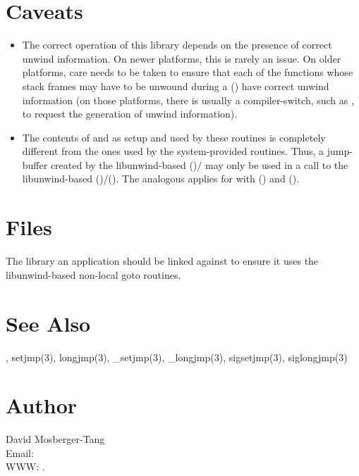 \documentclass{article}
\begin{document}
\section{Caveats}

\begin{itemize}
\item The correct operation of this library depends on the presence of
  correct unwind information.  On newer platforms, this is rarely an
  issue.  On older platforms, care needs to be taken to
  ensure that each of the functions whose stack frames may have to be
  unwound during a () have correct unwind information
  (on those platforms, there is usually a compiler-switch, such as
  , to request the generation of unwind
  information).
\item The contents of  and  as setup
  and used by these routines is completely different from the ones
  used by the system-provided routines.  Thus, a jump-buffer created
  by the libunwind-based ()/ may only be
  used in a call to the libunwind-based
  ()/().  The analogous applies for
   with () and ().
\end{itemize}

\section{Files}

\begin{Description}
\item[\Opt{-l}\File{unwind-setjmp}] The library an application should
  be linked against to ensure it uses the libunwind-based non-local
  goto routines.
\end{Description}


\section{See Also}

,
setjmp(3), longjmp(3),
\_setjmp(3), \_longjmp(3),
sigsetjmp(3), siglongjmp(3)

\section{Author}

\noindent
David Mosberger-Tang\\
Email: \\
WWW: .
\LatexManEnd
\end{document}
